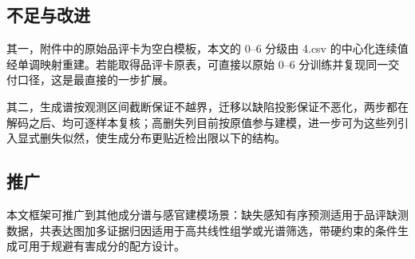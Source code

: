\documentclass[zihao=-4,a4paper,UTF8,fontset=none]{ctexart}
\begin{document}
\subsection{不足与改进}

其一，附件中的原始品评卡为空白模板，本文的 0--6 分级由 4.csv 的中心化连续值经单调映射重建。若能取得品评卡原表，可直接以原始 0--6 分训练并复现同一交付口径，这是最直接的一步扩展。

其二，生成谱按观测区间截断保证不越界，迁移以缺陷投影保证不恶化，两步都在解码之后、均可逐样本复核；高删失列目前按原值参与建模，进一步可为这些列引入显式删失似然，使生成分布更贴近检出限以下的结构。


\subsection{推广}

本文框架可推广到其他成分谱与感官建模场景：缺失感知有序预测适用于品评缺测数据，共表达图加多证据归因适用于高共线性组学或光谱筛选，带硬约束的条件生成可用于规避有害成分的配方设计。

\clearpage
\end{document}
